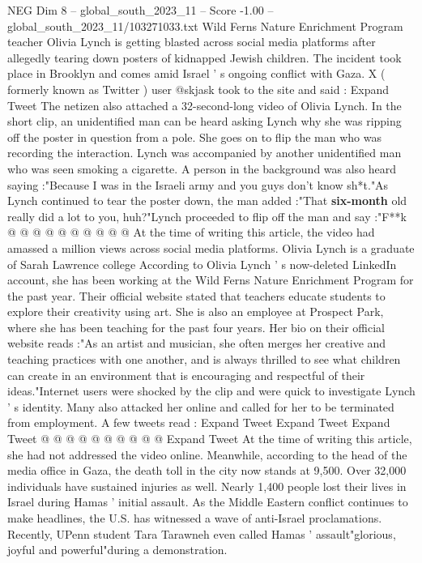 \begin{textsample}{NEG Dim 8 – global\_south\_2023\_11 – Score -1.00 – global\_south\_2023\_11/103271033.txt}  \label{ex:f8_neg_080}
Wild Ferns Nature Enrichment Program teacher Olivia Lynch is getting blasted across social media platforms after allegedly tearing down posters of kidnapped Jewish children.
The incident took place in Brooklyn and comes amid Israel ' s ongoing conflict with Gaza.
X ( formerly known as Twitter ) user @skjask took to the site and said : Expand Tweet The netizen also attached a 32-second-long video of Olivia Lynch.
In the short clip, an unidentified man can be heard asking Lynch why she was ripping off the poster in question from a pole.
She goes on to flip the man who was recording the interaction.
Lynch was accompanied by another unidentified man who was seen smoking a cigarette.
A person in the background was also heard saying :"Because I was in the Israeli army and you guys don't know sh*t."As Lynch continued to tear the poster down, the man added :"That \textbf{six-month} old really did a lot to you, huh?"Lynch proceeded to flip off the man and say :"F**k @ @ @ @ @ @ @ @ @ @ At the time of writing this article, the video had amassed a million views across social media platforms.
Olivia Lynch is a graduate of Sarah Lawrence college According to Olivia Lynch ' s now-deleted LinkedIn account, she has been working at the Wild Ferns Nature Enrichment Program for the past year.
Their official website stated that teachers educate students to explore their creativity using art.
She is also an employee at Prospect Park, where she has been teaching for the past four years.
Her bio on their official website reads :"As an artist and musician, she often merges her creative and teaching practices with one another, and is always thrilled to see what children can create in an environment that is encouraging and respectful of their ideas."Internet users were shocked by the clip and were quick to investigate Lynch ' s identity.
Many also attacked her online and called for her to be terminated from employment.
A few tweets read : Expand Tweet Expand Tweet Expand Tweet @ @ @ @ @ @ @ @ @ @ Expand Tweet At the time of writing this article, she had not addressed the video online.
Meanwhile, according to the head of the media office in Gaza, the death toll in the city now stands at 9,500.
Over 32,000 individuals have sustained injuries as well.
Nearly 1,400 people lost their lives in Israel during Hamas ' initial assault.
As the Middle Eastern conflict continues to make headlines, the U.S. has witnessed a wave of anti-Israel proclamations.
Recently, UPenn student Tara Tarawneh even called Hamas ' assault"glorious, joyful and powerful"during a demonstration.

\end{textsample}
